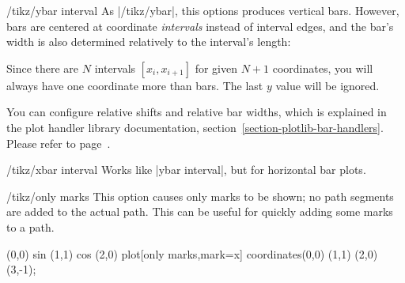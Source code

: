 \begin{key}{/tikz/ybar interval}
  As |/tikz/ybar|, this options produces vertical bars. However, bars are centered at coordinate \emph{intervals} instead of interval edges, and the bar's width is also determined relatively to the interval's length:

\begin{codeexample}[]
\end{codeexample}
	Since there are $N$ intervals $[x_i,x_{i+1}]$ for given $N+1$ coordinates, you will always have one coordinate more than bars. The last $y$ value will be ignored.

	You can configure relative shifts and relative bar widths, which is explained in the plot handler library documentation, section~\ref{section-plotlib-bar-handlers}. Please refer to page~\pageref{key-bar-interval-width}.
\end{key}

\begin{key}{/tikz/xbar interval}
  Works like |ybar interval|, but for horizontal bar plots.

\begin{codeexample}[]
\end{codeexample}
\end{key}

\begin{key}{/tikz/only marks}
  This option causes only marks to be shown; no path segments are
  added to the actual path. This can be useful for quickly adding some
  marks to a path.

\begin{codeexample}[]
\tikz \draw (0,0) sin (1,1) cos (2,0)
  plot[only marks,mark=x] coordinates{(0,0) (1,1) (2,0) (3,-1)};
\end{codeexample}
\end{key}

